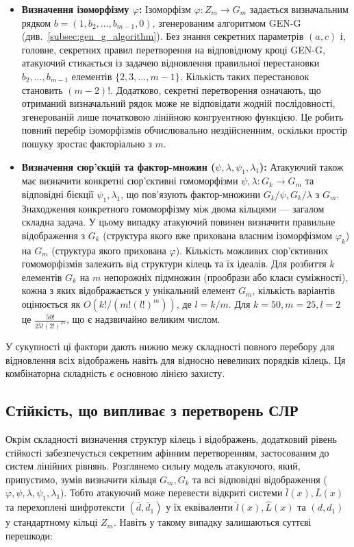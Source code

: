 \begin{itemize}
    \item \textbf{Визначення ізоморфізму $\varphi$:} Ізоморфізм $\varphi: Z_m \to G_m$ задається визначальним рядком $b = (1, b_2, \ldots, b_{m-1}, 0)$, згенерованим алгоритмом GEN-G (див.~\ref{subsec:gen_g_algorithm}). Без знання секретних параметрів $(a, c)$ і, головне, секретних правил перетворення на відповідному кроці GEN-G, атакуючий стикається із задачею відновлення правильної перестановки $b_2, \ldots, b_{m-1}$ елементів $\{2, 3, \ldots, m-1\}$. Кількість таких перестановок становить $(m-2)!$. Додатково, секретні перетворення означають, що отриманий визначальний рядок може не відповідати жодній послідовності, згенерованій лише початковою лінійною конгруентною функцією. Це робить повний перебір ізоморфізмів обчислювально нездійсненним, оскільки простір пошуку зростає факторіально з $m$.
    \item \textbf{Визначення сюр'єкцій та фактор-множин ($\psi, \lambda, \psi_1, \lambda_1$):} Атакуючий також має визначити конкретні сюр'єктивні гомоморфізми $\psi, \lambda: G_k \to G_m$ та відповідні бієкції $\psi_1, \lambda_1$, що пов'язують фактор-множини $G_k/\psi, G_k/\lambda$ з $G_m$. Знаходження конкретного гомоморфізму між двома кільцями — загалом складна задача. У цьому випадку атакуючий повинен визначити правильне відображення з $G_k$ (структура якого вже прихована власним ізоморфізмом $\varphi_k$) на $G_m$ (структура якого прихована $\varphi$). Кількість можливих сюр'єктивних гомоморфізмів залежить від структури кілець та їх ідеалів. Для розбиття $k$ елементів $G_k$ на $m$ непорожніх підмножин (прообрази або класи суміжності), кожна з яких відображається у унікальний елемент $G_m$, кількість варіантів оцінюється як $O(k! / (m! (l!)^m))$, де $l = k/m$. Для $k=50, m=25, l=2$ це $\frac{50!}{25!(2!)^{25}}$, що є надзвичайно великим числом.
\end{itemize}

У сукупності ці фактори дають нижню межу складності повного перебору для відновлення всіх відображень навіть для відносно невеликих порядків кілець. Ця комбінаторна складність є основною лінією захисту.

\subsection{Стійкість, що випливає з перетворень СЛР}
\label{subsec:security_sle_transform}
Окрім складності визначення структур кілець і відображень, додатковий рівень стійкості забезпечується секретним афінним перетворенням, застосованим до систем лінійних рівнянь.
Розглянемо сильну модель атакуючого, який, припустимо, зумів визначити кільця $G_m, G_k$ та всі відповідні відображення ($\varphi, \psi, \lambda, \psi_1, \lambda_1$).
Тобто атакуючий може перевести відкриті системи $\bar{l}(x), \bar{L}(x)$ та перехоплені шифротексти $(\bar{d}, \bar{d}_1)$ у їх еквіваленти $\hat{l}(x), \hat{L}(x)$ та $(d, d_1)$ у стандартному кільці $Z_m$.
Навіть у такому випадку залишаються суттєві перешкоди:

